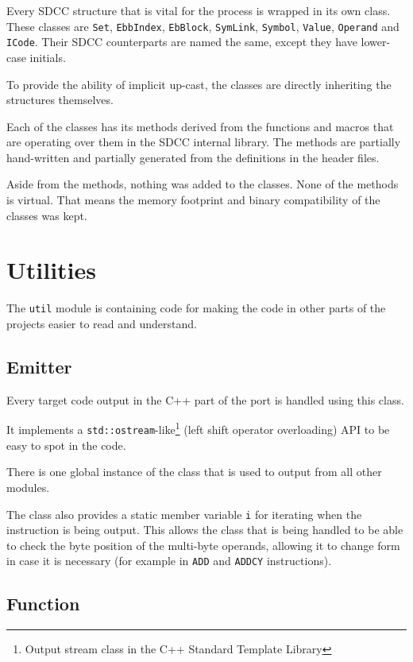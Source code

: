             Every SDCC structure that is vital for the process is wrapped in its own class. These classes are \texttt{Set}, \texttt{EbbIndex}, \texttt{EbBlock}, \texttt{SymLink}, \texttt{Symbol}, \texttt{Value}, \texttt{Operand} and \texttt{ICode}. Their SDCC counterparts are named the same, except they have lower-case initials.

            To provide the ability of implicit up-cast, the classes are directly inheriting the structures themselves.

            Each of the classes has its methods derived from the functions and macros that are operating over them in the SDCC internal library. The methods are partially hand-written and partially generated from the definitions in the header files.

            Aside from the methods, nothing was added to the classes. None of the methods is virtual. That means the memory footprint and binary compatibility of the classes was kept.

    \section{Utilities}

    The \texttt{util} module is containing code for making the code in other parts of the projects easier to read and understand.

        \subsection{Emitter}\label{emitter}

        Every target code output in the C++ part of the port is handled using this class.

        It implements a \texttt{std::ostream}-like\footnote{Output stream class in the C++ Standard Template Library} (left shift operator overloading) API to be easy to spot in the code.

        There is one global instance of the class that is used to output from all other modules.

        The class also provides a static member variable \texttt{i} for iterating when the instruction is being output. This allows the class that is being handled to be able to check the byte position of the multi-byte operands, allowing it to change form in case it is necessary (for example in \texttt{ADD} and \texttt{ADDCY} instructions).

        \subsection{Function}

